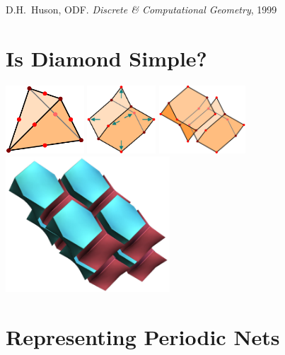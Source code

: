 \documentclass{beamer}
\begin{document}
\begin{frame}
\begin{center}
    {\small
      D.H.\ Huson, ODF. {\it Discrete \& Computational Geometry}, 1999
    }
  \end{center}
\end{frame}


\section{Is Diamond Simple?}

\begin{frame}
  \begin{center}
    \includegraphics[height=1.0in]{extetra1}
    \hspace{2mm}
    \includegraphics[height=1.0in]{extetra2}
    \hspace{2mm}
    \includegraphics[height=1.0in]{extetra3}\\[2mm]
    \includegraphics[height=2.0in]{diamond-tiling}
  \end{center}
\end{frame}


\section{Representing Periodic Nets}
\end{document}
